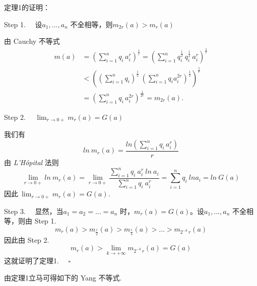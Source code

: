 \documentclass{article}
\begin{document}
\newpage

\noindent 定理1的证明：

\vspace{10pt}

Step 1. \ \ 设\(a_1,\dots ,a_n\) 不全相等，则\(m_{2r}(a) > m_r(a)\)

\vspace{10pt}

由 Cauchy 不等式
\begin{align*}
    m(a) &= \left(\sum_{i=1}^n q_i\,a_i^r\right)^\frac{1}{r} =\left(\sum_{i=1}^n q_i^{\frac{1}{2}}\,q_i^{\frac{1}{2}}\,a_i^r\right)^\frac{1}{r} \\
    &< \left( (\sum_{i=1}^n q_i)^\frac{1}{2}\ (\sum_{i=1}^n q_i a_i^{2r})^\frac{1}{2}  \right)^\frac{1}{r} \\
    &= \left(\sum_{i=1}^n q_i\,a_i^{2r}\right)^\frac{1}{2r} = m_{2r}(a).
\end{align*}

Step 2. \(\quad \lim_{r \to 0+} m_r(a) = G(a)\)

\vspace{20pt}

我们有
\begin{equation*}
    ln\ m_r(a) = \frac{ln(\sum_{i=1}^n q_i\,a_i^r)}{r}
\end{equation*}
由 \textit{L'Hôpital} 法则
\begin{equation*}
    \lim_{r \to 0 + }ln\ m_r(a) = \lim_{r \to 0 + }\frac{\sum_{i=1}^n q_i\ a_i^r\ ln\ a_i}{\sum_{i=1}^n q_i\ a_i^r} = \sum_{i=1}^n q_i\ ln a_i = ln\ G(a)
\end{equation*}
因此\(\ \lim_{r \to 0 +} m_r(a) = G(a) \).

\vspace{20pt}

Step 3. \ \ 显然，当\(a_1 = a_2 = \dots = a_n\) 时，\(m_r(a) = G(a)\)。设\(a_1,\dots ,a_n\) 不全相等，则由 Step 1.
\begin{equation*}
    m_r(a) > m_{\frac{r}{2} }(a) > m_{\frac{r}{4} }(a) > \dots > m_{2^ { - k}\,r }(a)
\end{equation*}
因此由 Step 2.
\begin{equation*}
    m_r(a) > \lim_{k \to  + \infty }m_{2^ { - k}\,r }(a) = G(a)
\end{equation*}
这就证明了定理1. \(\quad \square\)

\newpage

由定理1立马可得如下的 Yang 不等式.

\vspace{20pt}
\end{document}
